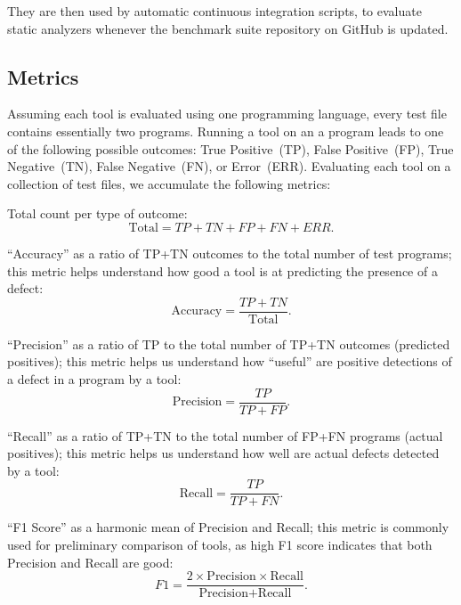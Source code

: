 They are then used by automatic continuous integration scripts, to evaluate static analyzers whenever the benchmark suite repository on GitHub is updated.

\subsection{Metrics}\label{sec:metrics}

Assuming each tool is evaluated using one programming language, every test file contains essentially two programs. Running a tool on an a program leads to one of the following possible outcomes: True Positive~(TP), False Positive~(FP), True Negative~(TN), False Negative~(FN), or Error~(ERR). Evaluating each tool on a collection of test files, we accumulate the following metrics:

Total count per type of outcome:
\begin{equation*}
\text{Total} = TP + TN + FP + FN + ERR.
\end{equation*}

``Accuracy'' as a ratio of TP+TN outcomes to the total number of test programs; this metric helps understand how good a tool is at predicting the presence of a defect:
\begin{equation*}
\text{Accuracy} = \frac{TP + TN}{\text{Total}}.
\end{equation*}

``Precision'' as a ratio of TP to the total number of TP+TN outcomes (predicted positives); this metric helps us understand how ``useful'' are positive detections of a defect in a program by a tool:
\begin{equation*}
\text{Precision} = \frac{TP}{TP + FP}.
\end{equation*}

``Recall'' as a ratio of TP+TN to the total number of FP+FN programs (actual positives); this metric helps us understand how well are actual defects detected by a tool:
\begin{equation*}
\text{Recall} = \frac{TP}{TP + FN}.
\end{equation*}

``F1 Score'' as a harmonic mean of Precision and Recall; this metric is commonly used for preliminary comparison of tools, as high F1 score indicates that both Precision and Recall are good:
\begin{equation*}
F1 = \frac{2 \times \text{Precision} \times \text{Recall}}{\text{Precision} + \text{Recall}}.
\end{equation*}

